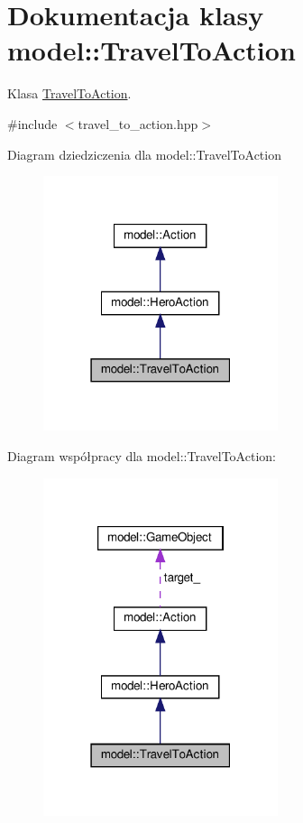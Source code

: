 \hypertarget{classmodel_1_1TravelToAction}{}\section{Dokumentacja klasy model\+:\+:Travel\+To\+Action}
\label{classmodel_1_1TravelToAction}


Klasa \hyperlink{classmodel_1_1TravelToAction}{Travel\+To\+Action}.  




{\ttfamily \#include $<$travel\+\_\+to\+\_\+action.\+hpp$>$}



Diagram dziedziczenia dla model\+:\+:Travel\+To\+Action\nopagebreak
\begin{figure}[H]
\begin{center}
\leavevmode
\includegraphics[width=195pt]{classmodel_1_1TravelToAction__inherit__graph}
\end{center}
\end{figure}


Diagram współpracy dla model\+:\+:Travel\+To\+Action\+:\nopagebreak
\begin{figure}[H]
\begin{center}
\leavevmode
\includegraphics[width=195pt]{classmodel_1_1TravelToAction__coll__graph}
\end{center}
\end{figure}
